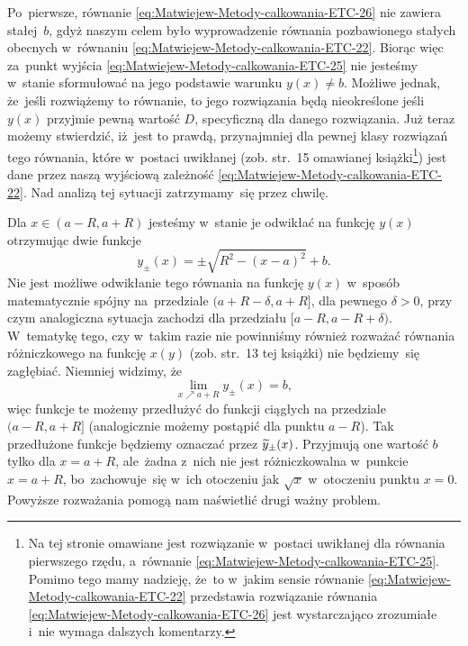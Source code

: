 \documentclass[a4paper,11pt]{article}
\numberwithin{equation}{section}
\begin{document}
Po~pierwsze, równanie \eqref{eq:Matwiejew-Metody-calkowania-ETC-26} nie
zawiera stałej~$b$, gdyż naszym celem było wyprowadzenie równania
pozbawionego stałych obecnych w~równaniu
\eqref{eq:Matwiejew-Metody-calkowania-ETC-22}. Biorąc więc za~punkt wyjścia
\eqref{eq:Matwiejew-Metody-calkowania-ETC-25} nie jesteśmy w~stanie
sformułować na jego podstawie warunku $y( x ) \neq b$. Możliwe jednak, że~jeśli
rozwiążemy to równanie, to jego rozwiązania będą nieokreślone jeśli $y( x )$
przyjmie pewną wartość $D$, specyficzną dla danego rozwiązania. Już teraz
możemy stwierdzić, iż~jest to prawdą, przynajmniej dla pewnej klasy
rozwiązań tego równania, które w~postaci uwikłanej (zob. str.~15 omawianej
książki\footnote{Na tej stronie omawiane jest rozwiązanie w~postaci
  uwikłanej dla równania pierwszego rzędu, a~równanie
  \eqref{eq:Matwiejew-Metody-calkowania-ETC-25}. Pomimo tego mamy nadzieję,
  że~to w~jakim sensie równanie
  \eqref{eq:Matwiejew-Metody-calkowania-ETC-22} przedstawia rozwiązanie
  równania \eqref{eq:Matwiejew-Metody-calkowania-ETC-26} jest wystarczająco
  zrozumiałe i~nie wymaga dalszych komentarzy.}) jest dane przez naszą
wyjściową zależność
\eqref{eq:Matwiejew-Metody-calkowania-ETC-22}. Nad analizą tej sytuacji
zatrzymamy~się przez chwilę.

Dla $x \in ( a - R, a + R )$ jesteśmy w~stanie je odwikłać na funkcję
$y( x )$ otrzymując dwie funkcje
\begin{equation}
  \label{eq:Matwiejew-Metody-calkowania-ETC-28}
  y_{ \pm }( x ) = \pm\sqrt{ R^{ 2 } - ( x - a )^{ 2 } } + b.
\end{equation}
Nie jest możliwe odwikłanie tego równania na funkcję $y( x )$ w~sposób
matematycznie spójny na~przedziale $( a + R - \delta, a + R ]$, dla pewnego
$\delta > 0$, przy czym analogiczna sytuacja zachodzi dla przedziału
$[ a - R, a - R + \delta )$. W~tematykę tego, czy w~takim razie nie powinniśmy
również rozważać równania różniczkowego na funkcję $x( y )$ (zob. str.~13
tej książki) nie będziemy~się zagłębiać. Niemniej widzimy, że
\begin{equation}
  \label{eq:Matwiejew-Metody-calkowania-ETC-29}
  \lim_{ x \nearrow a + R } y_{ \pm }( x ) = b,
\end{equation}
więc funkcje te możemy przedłużyć do funkcji ciągłych na przedziale
$( a - R, a + R ]$ (analogicznie możemy postąpić dla punktu $a - R$).
Tak przedłużone funkcje będziemy oznaczać przez $\widetilde{y}_{ \pm }( x )$.
Przyjmują one wartość $b$ tylko dla $x = a + R$, ale~żadna z~nich nie jest
różniczkowalna w~punkcie $x = a + R$, bo~zachowuje~się w~ich otoczeniu jak
$\sqrt{ x }$ w~otoczeniu punktu $x = 0$. Powyższe rozważania pomogą nam
naświetlić drugi ważny problem.
\end{document}
